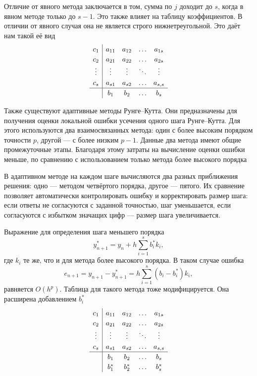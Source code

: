 \documentclass[a4paper,12pt]{article}
\begin{document}
	Отличие от явного метода заключается в том, сумма по \(j\) доходит до \(s\),
	когда в явном методе только до \(s-1\). Это также влияет на таблицу
	коэффициентов. В отличии от явного случая она не является строго
	нижнетреугольной. Это даёт нам такой её вид
	\begin{equation*}
	\renewcommand\arraystretch{1.2}
	\begin{array}
		{c|ccccc}
		c_1 &a_{11} &a_{12} &\ldots &a_{1s}\\
		c_2 &a_{21} &a_{22}&\ldots&a_{2s}\\
		\vdots &\vdots &\vdots &\ddots &\vdots\\
		c_s& a_{s1} &a_{s2} &\ldots &a_{s,s}\\
		\hline
		& b_1 &b_2 &\ldots &b_{s}
	\end{array}
	\end{equation*}


Также существуют адаптивные методы  Рунге--Кутта. Они предназначены для получения оценки локальной ошибки усечения одного шага Рунге--Кутта. Для этого используются два взаимосвязанных метода: один с более высоким порядком точности \(p\), другой --- с более низким \(p-1\). Данные два метода имеют общие промежуточные этапы. Благодаря этому затраты на вычисление оценки ошибки меньше, по сравнению с использованием только метода более высокого порядка

	В адаптивном методе на каждом шаге вычисляются два разных приближения решения: одно --- методом четвёртого порядка, другое --- пятого. Их сравнение позволяет автоматически контролировать ошибку и корректировать размер шага: если ответы не согласуются с заданной точностью, шаг уменьшается, если согласуются с избытком значащих цифр --- размер шага увеличивается.

	Выражение для определения шага меньшего порядка
	\begin{equation}
		y_{n+1}^{*}=y_n+h\sum_{i=1}^{s}b_i^{*}k_i,
	\end{equation}
	где \(k_i\) те же, что и для метода более высокого порядка. В таком случае ошибка
	\begin{equation}
		e_{n+1}=y_{n+1}-y_{n+1}^{*}=h\sum_{i=1}^{s}(b_i-b_i^{*})k_i,
	\end{equation}
	равняется \(O(h^p)\). Таблица для такого метода тоже модифицируется.
	Она расширена добавлением \(b_i^{*}\)
	\begin{equation*}
	\renewcommand\arraystretch{1.2}
	\begin{array}
		{c|ccccc}
		c_1 &a_{11} &a_{12} &\ldots &a_{1s}\\
		c_2 &a_{21} &a_{22}&\ldots&a_{2s}\\
		\vdots &\vdots &\vdots &\ddots &\vdots\\
		c_s& a_{s1} &a_{s2} &\ldots &a_{s,s}\\
		\hline
		& b_1 &b_2 &\ldots &b_{s}\\
		& b_1^{*} &b_2^{*} &\ldots &b_{s}^{*}
	\end{array}
	\end{equation*}
\end{document}
